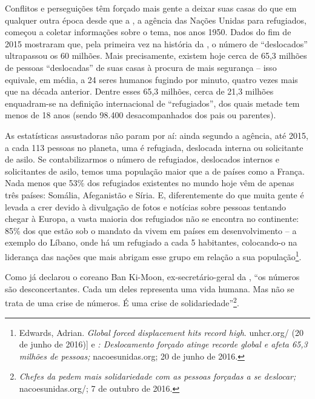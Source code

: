 

Conflitos e perseguições têm forçado mais gente a deixar suas casas do
que em qualquer outra época desde que a , a agência das Nações
Unidas para refugiados, começou a coletar informações sobre o tema, nos
anos 1950. Dados do fim de 2015 mostraram que, pela primeira vez na
história da , o número de ``deslocados'' ultrapassou os 60 milhões.
Mais precisamente, existem hoje cerca de 65,3 milhões de pessoas
``deslocadas'' de suas casas à procura de mais segurança -- isso
equivale, em média, a 24 seres humanos fugindo por minuto, quatro vezes
mais que na década anterior. Dentre esses 65,3 milhões, cerca de 21,3
milhões enquadram-se na definição internacional de ``refugiados'', dos
quais metade tem menos de 18 anos (sendo 98.400 desacompanhados dos pais
ou parentes).

As estatísticas assustadoras não param por aí: ainda segundo a agência,
até 2015, a cada 113 pessoas no planeta, uma é refugiada, deslocada
interna ou solicitante de asilo. Se contabilizarmos o número de
refugiados, deslocados internos e solicitantes de asilo, temos uma
população maior que a de países como a França. Nada menos que 53\% dos
refugiados existentes no mundo hoje vêm de apenas três países: Somália,
Afeganistão e Síria. E, diferentemente do que muita gente é levada a
crer devido à divulgação de fotos e notícias sobre pessoas tentando
chegar à Europa, a vasta maioria dos refugiados não se encontra no
continente: 85\% dos que estão sob o mandato da  vivem em países em
desenvolvimento -- a exemplo do Líbano, onde há um refugiado a cada 5
habitantes, colocando-o na liderança das nações que mais abrigam esse
grupo em relação a sua população\footnote{Edwards, Adrian. \emph{Global forced
  displacement hits record high}.
  {unhcr.org/} (20 de
  junho de 2016){]} e \emph{: Deslocamento forçado atinge recorde
  global e afeta 65,3 milhões de pessoas;}
  nacoesunidas.org; 20
  de junho de 2016.}. 



Como já declarou o coreano Ban Ki-Moon,
ex-secretário-geral da , ``os números são desconcertantes. Cada um
deles representa uma vida humana. Mas não se trata de uma crise de
números. É uma crise de solidariedade''\footnote{\emph{Chefes da 
  pedem mais solidariedade com as pessoas forçadas a se deslocar;}
  {nacoesunidas.org/}; 7
  de outubro de 2016.}.




